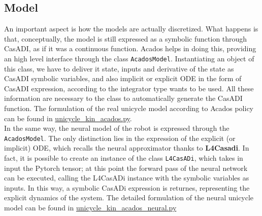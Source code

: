 \subsection{Model}\label{AcadosModel}
An important aspect is how the models are actually discretized. What happens is that,
conceptually, the model is still expressed as a symbolic function through CasADI, as
if it was a continuous function. Acados helps in doing this, providing an high
level interface through the class \texttt{AcadosModel}. Instantiating an object of this class,
we have to deliver it state, inputs and derivative of the state as CasADI symbolic variables,
and also implicit or explicit ODE in the form of CasADI expression, according to the integrator
type wants to be used. All these information are necessary to the class to automatically
generate the CasADI function. The formulation of the real unicycle model according to 
Acados policy can be found in 
\href{https://github.com/neverorfrog/simple_neural_mpc/blob/mlp-tests/src/simple_neural_mpc/models/unicycle_kin/unicycle_kin_acados.py}{unicycle\_kin\_acados.py}.\\
In the same way, the neural model of the robot is expressed through the \texttt{AcadosModel}.
The only distinction lies in the expression of the explicit (or implicit) ODE, which recalls 
the neural approximator thanks to \textbf{L4Casadi}. In fact, it is possible to create 
an instance of the class \texttt{L4CasADi}, which takes in input the Pytorch tensor; 
at this point the forward pass of the neural network can be executed, calling the L4CasADi 
instance with the symbolic variables as inputs. In this way, a symbolic CasADi expression is returnes,
representing the explicit dynamics of the system. The detailed formulation of the neural unicycle
model can be found in 
\href{https://github.com/neverorfrog/simple_neural_mpc/blob/mlp-tests/src/simple_neural_mpc/models/unicycle_kin/unicycle_kin_acados_neural.py}{unicycle\_kin\_acados\_neural.py}  


